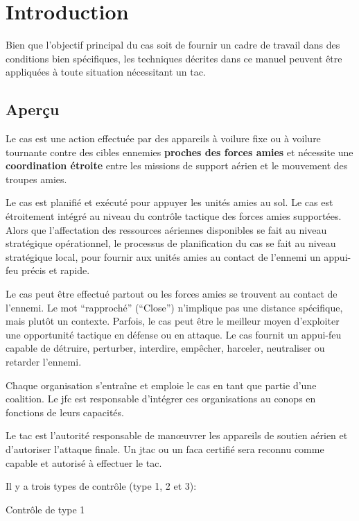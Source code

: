 \chapter{Introduction}

\begin{center}
\end{center}

\e
	
    \item 
	Bien que l'objectif principal du \acrshort{cas} soit de fournir un cadre de travail dans des conditions bien spécifiques, les techniques décrites dans ce manuel peuvent être appliquées à toute situation nécessitant un \gls{tac}.%
\ed

\section{Aperçu}

\e
    \item
    Le \acrfull{cas} est une action effectuée par des appareils à voilure fixe ou à voilure tournante contre des cibles ennemies \textbf{proches des forces amies} et nécessite une \textbf{coordination étroite} entre les missions de support aérien et le mouvement des troupes amies.
    \item
    Le \acrshort{cas} est planifié et exécuté pour appuyer les unités amies au sol. Le \acrshort{cas} est étroitement intégré au niveau du contrôle tactique des forces amies supportées. Alors que l'affectation des ressources aériennes disponibles se fait au niveau stratégique opérationnel, le processus de planification du \acrshort{cas} se fait au niveau stratégique local, pour fournir aux unités amies au contact de l'ennemi un appui-feu précis et rapide.
    \item
    Le \acrshort{cas} peut être effectué partout ou les forces amies se trouvent au contact de l'ennemi. Le mot ``rapproché'' (``Close'') n'implique pas une distance spécifique, mais plutôt un contexte. Parfois, le \acrshort{cas} peut être le meilleur moyen d'exploiter une opportunité tactique en défense ou en attaque. Le \acrshort{cas} fournit un appui-feu capable de détruire, perturber, interdire, empêcher, harceler, neutraliser ou retarder l'ennemi.
    \item
    Chaque organisation s'entraîne et emploie le \gls{cas} en tant que partie d'une coalition. Le \gls{jfc} est responsable d'intégrer ces organisations au \gls{conops} en fonctions de leurs capacités.
    \item
    Le \gls{tac} est l'autorité responsable de manœuvrer les appareils de soutien aérien et d'autoriser l'attaque finale. Un \gls{jtac} ou un \gls{faca} certifié sera reconnu comme capable et autorisé à effectuer le \gls{tac}.
    \item
    Il y a trois types de contrôle (type 1, 2 et 3):
    \ee
        \item
        Contrôle de type 1


